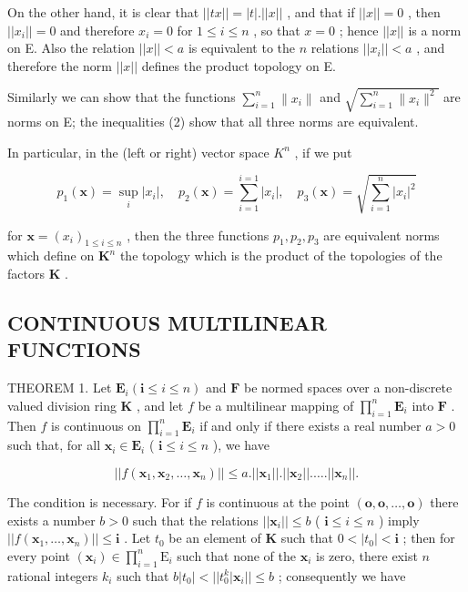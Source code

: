 On the other hand, it is clear that \(||tx|| = |t|.||x||\) , and that if \(||x|| = 0\) , then \(||x_i|| = 0\) and therefore \(x_i = 0\) for \(1 \leqslant i \leqslant n\) , so that \(x = 0\) ; hence \(||x||\) is a norm on E. Also the relation \(||x|| < a\) is equivalent to the \(n\) relations \(||x_i|| < a\) , and therefore the norm \(||x||\) defines the product topology on E.

Similarly we can show that the functions \(\sum_{i=1}^{n} \|x_i\|\) and \(\sqrt{\sum_{i=1}^{n} \|x_i\|^2}\) are norms on E; the inequalities (2) show that all three norms are equivalent.

In particular, in the (left or right) vector space \(K^{n}\) , if we put

\[
p _ {1} (\boldsymbol {x}) = \sup _ {i} | x _ {i} |, \quad p _ {2} (\boldsymbol {x}) = \sum_ {i = 1} ^ {i = 1} | x _ {i} |, \quad p _ {3} (\boldsymbol {x}) = \sqrt {\sum_ {i = 1} ^ {n} | x _ {i} | ^ {2}}
\]

for \(\pmb{x} = (x_{i})_{1\leqslant i\leqslant n}\) , then the three functions \(p_1, p_2, p_3\) are equivalent norms which define on \(\mathbf{K}^n\) the topology which is the product of the topologies of the factors \(\mathbf{K}\) .

\subsection{CONTINUOUS MULTILINEAR FUNCTIONS}

THEOREM 1. Let \(\mathbf{E}_i(\mathbf{i} \leqslant i \leqslant n)\) and \(\mathbf{F}\) be normed spaces over a non-discrete valued division ring \(\mathbf{K}\) , and let \(f\) be a multilinear mapping of \(\prod_{i=1}^{n} \mathbf{E}_i\) into \(\mathbf{F}\) . Then \(f\) is continuous on \(\prod_{i=1}^{n} \mathbf{E}_i\) if and only if there exists a real number \(a > 0\) such that, for all \(\boldsymbol{x}_i \in \mathbf{E}_i\) ( \(\mathbf{i} \leqslant i \leqslant n\) ), we have

\[
\left| \left| f \left(\boldsymbol {x} _ {1}, \boldsymbol {x} _ {2}, \dots , \boldsymbol {x} _ {n}\right) \right| \right| \leqslant a. \left| \left| \boldsymbol {x} _ {1} \right| \right|. \left| \left| \boldsymbol {x} _ {2} \right| \right|. \dots . \left| \left| \boldsymbol {x} _ {n} \right| \right|.\tag{3}
\]

The condition is necessary. For if \(f\) is continuous at the point \((\mathbf{o}, \mathbf{o}, \ldots, \mathbf{o})\) there exists a number \(b > 0\) such that the relations \(||\boldsymbol{x}_i|| \leqslant b\) ( \(\mathbf{i} \leqslant i \leqslant n\) ) imply \(||f(\boldsymbol{x}_1, \ldots, \boldsymbol{x}_n)|| \leqslant \mathbf{i}\) . Let \(t_0\) be an element of \(\mathbf{K}\) such that \(0 < |t_0| < \mathbf{i}\) ; then for every point \((\boldsymbol{x}_i) \in \prod_{i=1}^{n} \mathrm{E}_i\) such that none of the \(\boldsymbol{x}_i\) is zero, there exist \(n\) rational integers \(k_i\) such that \(b|t_0| < ||t_0^k |\boldsymbol{x}_i|| \leqslant b\) ; consequently we have

